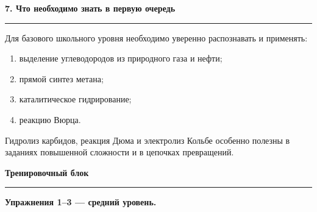 \documentclass[a4paper,12pt]{article}
\newcommand{\sectiontitle}[1]{%
    \vspace{0.9em}%
    {\Large\bfseries\color{darkaccent}#1\par}%
    \vspace{0.2em}%
    {\color{accent}\rule{\linewidth}{0.8pt}}%
    \vspace{0.45em}%
}
\begin{document}
\sectiontitle{7. Что необходимо знать в первую очередь}

Для базового школьного уровня необходимо уверенно распознавать и применять:

\begin{enumerate}
    \item выделение углеводородов из природного газа и нефти;
    \item прямой синтез метана;
    \item каталитическое гидрирование;
    \item реакцию Вюрца.
\end{enumerate}

Гидролиз карбидов, реакция Дюма и электролиз Кольбе особенно полезны
в заданиях повышенной сложности и в цепочках превращений.

\clearpage
\sectiontitle{Тренировочный блок}

\textbf{Упражнения 1--3 --- средний уровень.}
\end{document}

